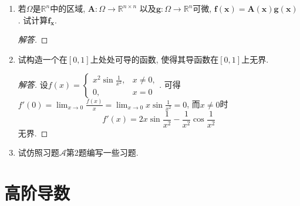 \begin{2b}
\begin{enumerate}
\item 若\(\varOmega\)是\(\mathbb{R}^n\)中的区域, 
\(\boldsymbol{A}:\varOmega\rightarrow\mathbb{R}^{n\times n}\)
以及\(\boldsymbol{g}:\varOmega\rightarrow\mathbb{R}^n\)可微, 
\(\boldsymbol{f}(\boldsymbol{x})=\boldsymbol{A}(\boldsymbol{x})\boldsymbol{g}(\boldsymbol{x})\). 试计算\(\boldsymbol{f_x}\).
\begin{proof}[解答]

\end{proof}
\item 试构造一个在\([0,1]\)上处处可导的函数, 使得其导函数在\([0,1]\)上无界.
\begin{proof}[解答]
设\(f(x)=\begin{cases}
x^2\sin\frac{1}{x^2},&x\ne 0,\\
0,&x=0
\end{cases}\). 可得\(f'(0)=\lim_{x\rightarrow 0}\frac{f(x)}{x}
=\lim_{x\rightarrow 0}x\sin\frac{1}{x^2}=0\), 
而\(x\ne 0\)时\[f'(x)=2x\sin\frac{1}{x^2}-\frac{1}{x^2}\cos\frac{1}{x^2}\]无界.
\end{proof}

\item 试仿照习题\(\boldsymbol{\mathcal{A}}\)第2题编写一些习题.
\end{enumerate}
\end{2b}

\section{高阶导数}

